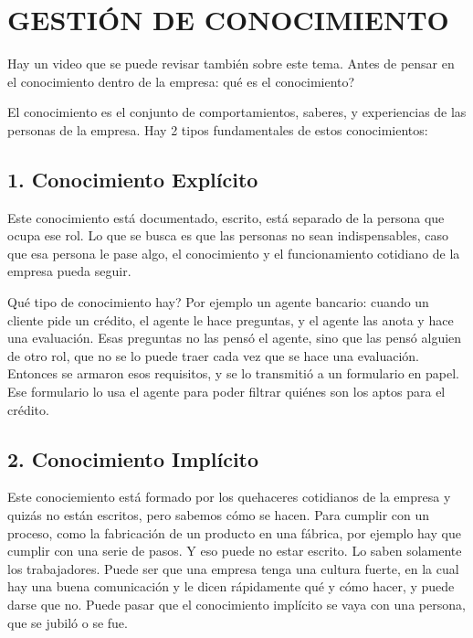 \clearpage
\twocolumn
\hypertarget{gestiuxf3n-de-conocimiento}{%
\section{GESTIÓN DE CONOCIMIENTO}\label{unidad-4-gestiuxf3n-de-conocimiento}}

Hay un video que se puede revisar también sobre este tema. Antes de
pensar en el conocimiento dentro de la empresa: qué es el conocimiento?

El conocimiento es el conjunto de comportamientos, saberes, y
experiencias de las personas de la empresa. Hay 2 tipos fundamentales de
estos conocimientos:

\hypertarget{conocimiento-expluxedcito}{%
\subsection{1. Conocimiento Explícito}\label{conocimiento-expluxedcito}}

Este conocimiento está documentado, escrito, está separado de la persona
que ocupa ese rol. Lo que se busca es que las personas no sean
indispensables, caso que esa persona le pase algo, el conocimiento y el
funcionamiento cotidiano de la empresa pueda seguir.

Qué tipo de conocimiento hay? Por ejemplo un agente bancario: cuando un
cliente pide un crédito, el agente le hace preguntas, y el agente las
anota y hace una evaluación. Esas preguntas no las pensó el agente, sino
que las pensó alguien de otro rol, que no se lo puede traer cada vez que
se hace una evaluación. Entonces se armaron esos requisitos, y se lo
transmitió a un formulario en papel. Ese formulario lo usa el agente
para poder filtrar quiénes son los aptos para el crédito.

\hypertarget{conocimiento-impluxedcito}{%
\subsection{2. Conocimiento Implícito}\label{conocimiento-impluxedcito}}

Este conociemiento está formado por los quehaceres cotidianos de la
empresa y quizás no están escritos, pero sabemos cómo se hacen. Para
cumplir con un proceso, como la fabricación de un producto en una
fábrica, por ejemplo hay que cumplir con una serie de pasos. Y eso puede
no estar escrito. Lo saben solamente los trabajadores. Puede ser que una
empresa tenga una cultura fuerte, en la cual hay una buena comunicación
y le dicen rápidamente qué y cómo hacer, y puede darse que no. Puede
pasar que el conocimiento implícito se vaya con una persona, que se
jubiló o se fue.


